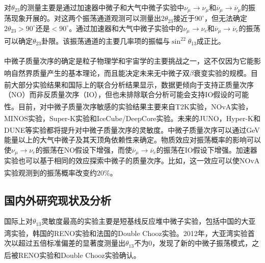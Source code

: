 \documentclass[a4paper,zihao=-4]{article}
\newcommand{\citess}[1]{\textsuperscript{\cite{#1}}}
\begin{document}
\paragraph{}对$\theta_{23}$的测量主要是通过加速器中微子和大气中微子实验中$\nu_\mu\to\nu_\mu$和$\overline{\nu}_\mu\to\overline{\nu}_\mu$的振荡现象开展的。对这两个振荡通道观测可以测量出$2\theta_{23}$接近于$90^\circ$，但无法确定$2\theta_{23}>90^\circ$还是$<90^\circ$。通过加速器和大气中微子实验中的$\nu_\mu\to\nu_e$和$\overline{\nu}_\mu\to\overline{\nu}_e$的振荡可以确定$\theta_{23}$卦限\citess{Agarwalla:2013ju}。该振荡通道的主要几率项的振幅与$\sin^22\theta_{13}$成正比。

\paragraph{}中微子质量次序的确定是粒子物理学和宇宙学的主要挑战之一，这不仅因为它能影响自然界质量产生的基本理论，而且能决定未来无中微子双$\beta$衰变实验的规模\citess{Gariazzo:2022ahe}。目前大部分实验结果和国际上的联合分析\citess{Esteban:2020cvm,Kelly:2020fkv}结果显示，数据更倾向于支持正质量次序（NO）而非反质量次序（IO），但也未排除联合分析可能会支持IO假设的可能性。目前，对中微子质量次序敏感的实验结果主要来自T2K实验\citess{T2K:2021xwb}，NOvA实验\citess{NOvA:2021nfi}，MINOS实验\citess{2018npa..confE.423A}，Super-K实验\citess{Super-Kamiokande:2017yvm}和IceCube/DeepCore实验\citess{IceCube:2017lak}。未来的JUNO\citess{JUNO:2021vlw}，Hyper-K\citess{Hyper-Kamiokande:2022smq}和DUNE\citess{DUNE:2020fgq}等实验都将提升对中微子质量次序的灵敏度。中微子质量次序可以通过GeV能量以上的大气中微子及其天顶角依赖性来确定。物质效应对振荡概率的影响可以使$\nu_\mu\to\nu_e$的振荡在NO假设下增强，而使$\overline{\nu}_\mu\to\overline{\nu}_e$的振荡在IO假设下增强。加速器实验也可以基于相同的效应探索中微子的质量次序。比如，这一效应可以使NOvA实验观测到的振荡概率改变约20\%\citess{NOvA:2021nfi}。

\subsection{国内外研究现状及分析}
国际上对$\theta_{13}$灵敏度最高的实验主要是短基线反应堆中微子实验，包括中国的大亚湾实验\citess{DayaBay:2022orm}，韩国的RENO实验\citess{RENO:2018dro}和法国的Double Chooz实验\citess{DoubleChooz:2019qbj}。2012年，大亚湾实验\citess{DayaBay:2012fng}首次以超过五倍标准偏差的显著度测量出$\theta_{13}$不为0，发现了新的中微子振荡模式，之后被RENO实验\citess{RENO:2012mkc}和Double Chooz实验\citess{DoubleChooz:2012gmf}确认。
\end{document}
